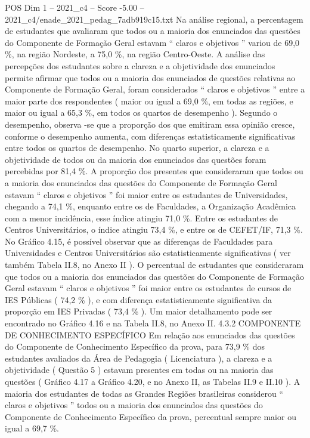 \begin{textsample}{POS Dim 1 – 2021\_c4 – Score -5.00 – 2021\_c4/enade\_2021\_pedag\_7adb919c15.txt}
Na análise regional, a percentagem de estudantes que avaliaram que todos ou a maioria dos enunciados das questões do Componente de Formação Geral estavam “ claros e objetivos ” variou de 69,0 \%, na região Nordeste, a 75,0 \%, na região Centro-Oeste.
A análise das percepções dos estudantes sobre a clareza e a objetividade dos enunciados permite afirmar que todos ou a maioria dos enunciados de questões relativas ao Componente de Formação Geral, foram considerados “ claros e objetivos ” entre a maior parte dos respondentes ( maior ou igual a 69,0 \%, em todas as regiões, e maior ou igual a 65,3 \%, em todos os quartos de desempenho ).
Segundo o desempenho, observa -se que a proporção dos que emitiram essa opinião cresce, conforme o desempenho aumenta, com diferenças estatisticamente significativas entre todos os quartos de desempenho.
No quarto superior, a clareza e a objetividade de todos ou da maioria dos enunciados das questões foram percebidas por 81,4 \%.
A proporção dos presentes que consideraram que todos ou a maioria dos enunciados das questões do Componente de Formação Geral estavam “ claros e objetivos ” foi maior entre os estudantes de Universidades, chegando a 74,1 \%, enquanto entre os de Faculdades, a Organização Acadêmica com a menor incidência, esse índice atingiu 71,0 \%.
Entre os estudantes de Centros Universitários, o índice atingiu 73,4 \%, e entre os de CEFET/IF, 71,3 \%.
No Gráfico 4.15, é possível observar que as diferenças de Faculdades para Universidades e Centros Universitários são estatisticamente significativas ( ver também Tabela II.8, no Anexo II ).
O percentual de estudantes que consideraram que todos ou a maioria dos enunciados das questões do Componente de Formação Geral estavam “ claros e objetivos ” foi maior entre os estudantes de cursos de IES Públicas ( 74,2 \% ), e com diferença estatisticamente significativa da proporção em IES Privadas ( 73,4 \% ).
Um maior detalhamento pode ser encontrado no Gráfico 4.16 e na Tabela II.8, no Anexo II. 4.3.2 COMPONENTE DE CONHECIMENTO ESPECÍFICO Em relação aos enunciados das questões do Componente de Conhecimento Específico da prova, para 73,9 \% dos estudantes avaliados da Área de Pedagogia ( Licenciatura ), a clareza e a objetividade ( Questão 5 ) estavam presentes em todas ou na maioria das questões ( Gráfico 4.17 a Gráfico 4.20, e no Anexo II, as Tabelas II.9 e II.10 ).
A maioria dos estudantes de todas as Grandes Regiões brasileiras considerou “ claros e objetivos ” todos ou a maioria dos enunciados das questões do Componente de Conhecimento Específico da prova, percentual sempre maior ou igual a 69,7 \%.

\end{textsample}
